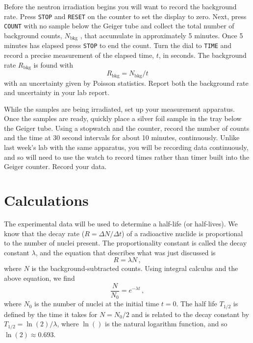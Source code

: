Before the neutron irradiation begins you will want to record the background rate. Press
\texttt{STOP} and \texttt{RESET} on the counter to set the display to zero. Next, press \texttt{COUNT} with no
sample below the Geiger tube and collect the total number of background counts, $N_\textrm{bkg}$ ,
that accumulate in approximately 5 minutes. Once 5 minutes has elapsed press \texttt{STOP} to
end the count. Turn the dial to \texttt{TIME} and record a precise measurement of the elapsed
time, $t$, in seconds. The background rate $R_\textrm{bkg}$ is found with
\begin{equation}
R_\textrm{bkg} = N_\textrm{bkg} /t
\end{equation}
with an uncertainty given by Poisson statistics. Report both the background rate and uncertainty in your lab report.

While the samples are being irradiated, set up your measurement apparatus. Once the samples are ready, quickly place a silver foil sample in the tray below the Geiger tube. Using a stopwatch and the
counter, record the number of counts and the time at 30 second intervals for
about 10 minutes, continuously. Unlike last week's lab with the same apparatus, you will
be recording data continuously, and so will need to use the watch to record times rather
than timer built into the Geiger counter. Record your data.

\section{Calculations}

The experimental data will be used to determine a half-life (or half-lives). We know that
the decay rate ($R=\Delta N / \Delta t$) of a radioactive nuclide is proportional to the number of nuclei present. The proportionality constant is called the decay constant $\lambda$, and the equation that describes what was just discussed is
\begin{equation}
 R = \lambda N \,,
\end{equation}
where $N$ is the background-subtracted counts. Using integral calculus and the above equation, we find
\begin{equation}
 \frac{N}{N_0} = e^{-\lambda t} \,,
\end{equation}
where $N_0$ is the number of nuclei at the initial time $t=0$. The half life $T_{1/2}$ is defined by
the time it takes for $N = N_0 /2$ and is related to the decay constant by $T_{1/2} = \ln(2)/ \lambda$, where
$\ln()$ is the natural logarithm function, and so $\ln(2) \approx 0.693$.

